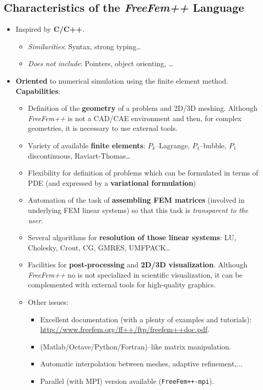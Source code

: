 \documentclass[12pt]{article}
\providecommand{\alert}[1]{\textbf{#1}}
\newcommand{\FF}{\textit{FreeFem++}\xspace}
\begin{document}
\subsection{Characteristics  of the \FF Language}
\begin{itemize}

\item Inspired by \alert{C/C++}.
  \begin{itemize}
  \item \emph{Similarities}: Syntax, strong typing\ldots{}
  \item \emph{Does not include}: Pointers, object orienting, \ldots{}
  \end{itemize}

\item \alert{Oriented} to numerical simulation using the finite element method.
  \alert{Capabilities}:
  \begin{itemize}
  \item Definition of the \textbf{geometry} of a problem and 2D/3D meshing.
    Although \FF is not a CAD/CAE environment and then, for complex
    geometries, it is necessary to use external tools.
  \item Variety of available \alert{finite elements}:
    $P_k$--Lagrange, $P_1$--bubble, $P_1$ discontinuous,
    Raviart-Thomas\ldots{}
  \item Flexibility for definition of problems which can be formulated
    in terms of PDE (and expressed by a \alert{variational formulation})
  \item Automation of the task of \textbf{assembling FEM matrices} (involved in
    underlying FEM linear systems) so that this task is \textit{transparent to the
    user}.
  \item Several algorithms for \alert{resolution of those linear
      systems}: LU, Cholesky, Crout, CG, GMRES, UMFPACK\ldots{}
  \item Facilities for \alert{post-processing} and \alert{2D/3D
      visualization}.  Although \FF no is not specialized in
    scientific visualization, it can be complemented with external
    tools for high-quality graphics.
  \item Other issues:
    \begin{itemize}
    \item Excellent documentation (with a plenty of examples and
      tutorials):
      \url{http://www.freefem.org/ff++/ftp/freefem++doc.pdf}.
    \item (Matlab/Octave/Python/Fortran)--like matrix manipulation.
    \item Automatic interpolation between meshes, adaptive refinement,...
    \item Parallel (with MPI) version available
      (\texttt{FreeFem++-mpi}).
    \end{itemize}
  \end{itemize}

\end{itemize} %
\end{document}
